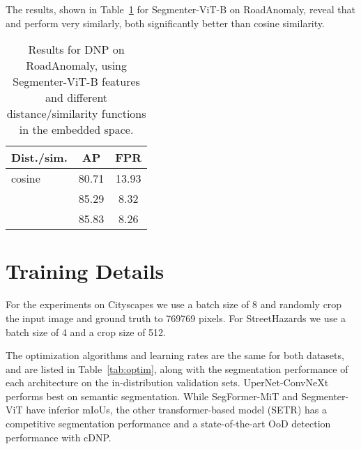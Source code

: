 \documentclass[10pt,twocolumn,letterpaper]{article}
\begin{document}
The results, shown in Table~\ref{tab:dist_sim_fns} for Segmenter-ViT-B on RoadAnomaly, reveal that  and  perform very similarly, both significantly better than cosine similarity. 

\begin{table}[]
    \centering
    \begin{tabular}{l|c|c}
        Dist./sim. & AP & FPR \\
        \midrule
        cosine & 80.71	& 13.93 \\
         & 85.29	& 8.32 \\
         & 85.83	& 8.26 \\
    \end{tabular}
    \caption{Results for DNP on RoadAnomaly, using Segmenter-ViT-B features and different distance/similarity functions in the embedded space.}
    \label{tab:dist_sim_fns}
\end{table}


\section{Training Details}
For the experiments on Cityscapes we use a batch size of 8 and randomly crop the input image and ground truth to 769769 pixels. For StreetHazards we use a batch size of 4 and a crop size of 512.

The optimization algorithms and learning rates are the same for both datasets, and are listed in Table~\ref{tab:optim}, along with the segmentation performance of each architecture on the in-distribution validation sets.
UperNet-ConvNeXt performs best on semantic segmentation. While SegFormer-MiT and Segmenter-ViT have inferior mIoUs, the other transformer-based model (SETR) has a competitive segmentation performance and a state-of-the-art OoD detection performance with cDNP.
\end{document}
